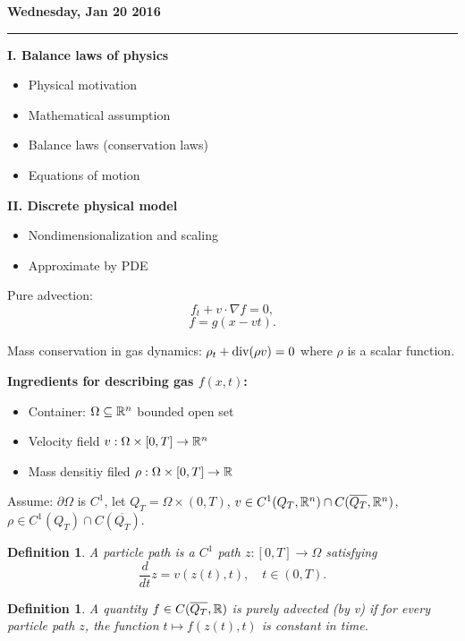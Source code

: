 \documentclass[11pt]{amsart}%
\newtheorem{definition}[theorem]{Definition}
\begin{document}
\textbf{Wednesday, Jan 20 2016}

\begin{center}\rule{0.5\linewidth}{\linethickness}\end{center}

{\bf I. Balance laws of physics}
\begin{itemize}
    \item Physical motivation
    \item Mathematical assumption
    \item Balance laws (conservation laws)
    \item Equations of motion
\end{itemize}

{\bf II. Discrete physical model}
\begin{itemize}
    \item Nondimensionalization and scaling
    \item Approximate by PDE
\end{itemize}
Pure advection:
$$f_t+v\cdot \nabla f =0,$$
$$f=g(x-vt).$$

Mass conservation in gas dynamics: $ \rho_t+{\rm div}(\rho v)=0$ where $\rho$ is a scalar function.

{\bf Ingredients for describing gas $f(x,t)$:}
\begin{itemize}
    \item Container: $\Omega\subseteq \mathbb{R}^n$ bounded open set
    \item Velocity field $v:\Omega\times[0,T] \to \mathbb{R}^n$
    \item Mass densitiy filed $\rho:\Omega\times[0,T]\to \mathbb{R}$
\end{itemize}

Assume: $\partial \Omega$ is $C^1$, let $Q_T=\Omega\times(0,T)$, $v\in C^1(Q_T,\mathbb{R}^n)\cap C(\overline{Q_T},\mathbb{R}^n)$, $\rho\in C^1(Q_T)\cap C(\overline{Q_T})$.

\begin{definition}
    A \emph{particle path} is a $C^1$ path $z:[0,T]\to \Omega$ satisfying
    $$\frac{d}{dt} z = v(z(t),t), \quad t\in (0,T).$$
\end{definition}

\begin{definition}
    A quantity $f\in C(\overline{Q_T},\mathbb{R})$ is \emph{purely advected} (by v) if for every particle path $z$, the function $t\mapsto f(z(t),t)$ is constant in time.
\end{definition}
\end{document}
